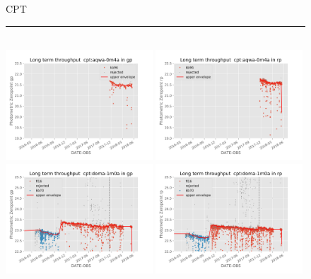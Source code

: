 \documentclass[draft]{spieman}
\begin{document}
\begin{figure}\ContinuedFloat
\centering
CPT \\ 
\rule{\textwidth}{0.4pt} \\
\includegraphics[width=0.49\textwidth]{images/photzptrend-cpt-aqwa-0m4a-gp.png} \hspace*{\fill}
\includegraphics[width=0.49\textwidth]{images/photzptrend-cpt-aqwa-0m4a-rp.png} \\
\includegraphics[width=0.49\textwidth]{images/photzptrend-cpt-doma-1m0a-gp.png} \hspace*{\fill} 
\includegraphics[width=0.49\textwidth]{images/photzptrend-cpt-doma-1m0a-rp.png} \\

\end{figure}
\end{document}
